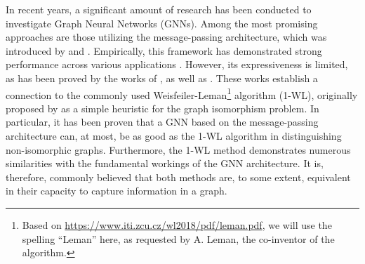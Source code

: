 In recent years, a significant amount of research has been conducted to investigate Graph Neural Networks (GNNs). Among the most promising approaches are those utilizing the message-passing architecture, which was introduced by \cite{Sca+2009} and \cite{Gil+2017}. 
Empirically, this framework has demonstrated strong performance across various applications \cite{Kip+2017, Ham+2017, Xu2018}. However, its expressiveness is limited, as has been proved by the works of \cite{Morris2018}, as well as \cite{Xu2018}. These works establish a connection to the commonly used Weisfeiler-Leman\footnote{Based on \href{https://www.iti.zcu.cz/wl2018/pdf/leman.pdf}{https://www.iti.zcu.cz/wl2018/pdf/leman.pdf}, we will use the spelling ``Leman'' here, as requested by A. Leman, the co-inventor of the algorithm.} algorithm (1-WL), originally proposed by \cite{Wei+1968} as a simple heuristic for the graph isomorphism problem. In particular, it has been proven that a GNN based on the message-passing architecture can, at most, be as good as the 1-WL algorithm in distinguishing non-isomorphic graphs. Furthermore, the 1-WL method demonstrates numerous similarities with the fundamental workings of the GNN architecture. It is, therefore, commonly believed that both methods are, to some extent, equivalent in their capacity to capture information in a graph.

